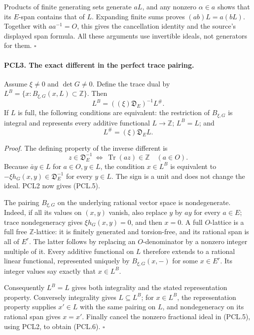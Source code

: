 \documentclass[11pt,a4paper]{article}
\numberwithin{equation}{section}
\theoremstyle{remark}\newtheorem{remark}[theorem]{Remark}
\begin{document}
Products of finite generating sets generate \(aL\), and any
nonzero \(\alpha\in a\) shows that its \(E\)-span contains
that of \(L\).  Expanding finite sums proves
\((ab)L=a(bL)\).  Together with \(aa^{-1}=O\), this gives
the cancellation identity and the source's displayed span
formula.  All these arguments use invertible ideals, not
generators for them. \hfill\(\square\)

\paragraph{PCL3. The exact different in the perfect trace pairing.}
\label{claim:PCL3}
Assume \(\xi\ne0\) and \(\det G\ne0\).  Define the
trace dual by
\(L^B=\{x:B_{\xi,G}(x,L)\subset\mathbb Z\}\).
Then
\[
 L^B=((\xi)\mathfrak D_E)^{-1}L^\# .              \tag{PCL.5}
\]
If \(L\) is full, the following conditions are equivalent:
the restriction of \(B_{\xi,G}\) is integral and represents
every additive functional \(L\to\mathbb Z\); \(L^B=L\);
and
\[
                         L^\#=(\xi)\mathfrak D_E L. \tag{PCL.6}
\]

\emph{Proof.}
The defining property of the inverse different is
\[
 z\in\mathfrak D_E^{-1}
       \ \Longleftrightarrow\
             \operatorname{Tr}(az)\in\mathbb Z\quad(a\in O).
\]
Because \(\bar a y\in L\) for \(a\in O,y\in L\), the
condition \(x\in L^B\) is equivalent to
\(-\xi h_G(x,y)\in\mathfrak D_E^{-1}\) for every
\(y\in L\).  The sign is a unit and does not change the
ideal.  PCL2 now gives (PCL.5).

The pairing \(B_{\xi,G}\) on the underlying rational vector
space is nondegenerate.  Indeed, if all its values on
\((x,y)\) vanish, also replace \(y\) by \(ay\) for every
\(a\in E\); trace nondegeneracy gives
\(\xi h_G(x,y)=0\), and then \(x=0\).
A full \(O\)-lattice is a full free \(\mathbb Z\)-lattice:
it is finitely generated and torsion-free, and its rational
span is all of \(E^r\).  The latter follows by replacing
an \(O\)-denominator by a nonzero integer multiple of it.
Every additive functional on \(L\) therefore extends to a
rational linear functional, represented uniquely by
\(B_{\xi,G}(x,-)\) for some \(x\in E^r\).  Its integer
values say exactly that \(x\in L^B\).

Consequently \(L^B=L\) gives both integrality and the stated
representation property.  Conversely integrality gives
\(L\subseteq L^B\); for \(x\in L^B\), the representation
property supplies \(x'\in L\) with the same pairing on
\(L\), and nondegeneracy on its rational span gives
\(x=x'\).  Finally cancel the nonzero fractional ideal in
(PCL.5), using PCL2, to obtain (PCL.6).
\hfill\(\square\)
\end{document}
